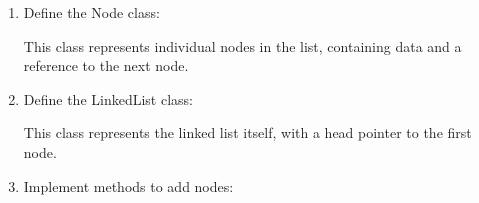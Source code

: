 \begin{enumerate}
\def\labelenumi{\arabic{enumi}.}
\item
  Define the Node class:

\begin{Shaded}
\begin{Highlighting}[]
     \NormalTok{(}
        \OperatorTok{=}
         \OperatorTok{=} 
\end{Highlighting}
\end{Shaded}

  This class represents individual nodes in the list, containing data
  and a reference to the next node.
\item
  Define the LinkedList class:

\begin{Shaded}
\begin{Highlighting}[]
     \NormalTok{(}\NormalTok{):}
        \OperatorTok{=} 
\end{Highlighting}
\end{Shaded}

  This class represents the linked list itself, with a head pointer to
  the first node.
\item
  Implement methods to add nodes:

\begin{Shaded}
\begin{Highlighting}[]
\OperatorTok{=}
      
        \OperatorTok{=}
\OperatorTok{=} 
    \NormalTok{:}
\OperatorTok{=}
 \OperatorTok{=}
\end{Highlighting}
\end{Shaded}


\end{enumerate}
